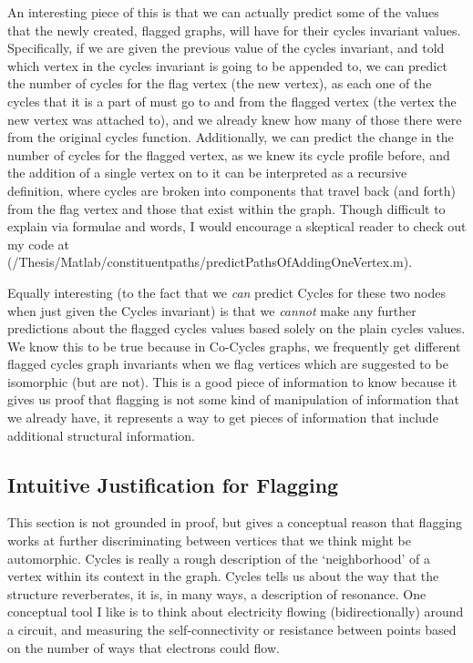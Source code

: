 An interesting piece of this is that we can actually predict some of the values that the newly created, flagged graphs, will have for their cycles invariant values.
Specifically, if we are given the previous value of the cycles invariant, and told which vertex in the cycles invariant is going to be appended to, we can predict the number of cycles for the flag vertex (the new vertex), as each one of the cycles that it is a part of must go to and from the flagged vertex (the vertex the new vertex was attached to), and we already knew how many of those there were from the original cycles function.
Additionally, we can predict the change in the number of cycles for the flagged vertex, as we knew its cycle profile before, and the addition of a single vertex on to it can be interpreted as a recursive definition, where cycles are broken into components that travel back (and forth) from the flag vertex and those that exist within the graph.
Though difficult to explain via formulae and words, I would encourage a skeptical reader to check out my code at (/Thesis/Matlab/constituentpaths/predictPathsOfAddingOneVertex.m).

Equally interesting (to the fact that we \emph{can} predict Cycles for these two nodes when just given the Cycles invariant) is that we \emph{cannot} make any further predictions about the flagged cycles values based solely on the plain cycles values.
We know this to be true because in Co-Cycles graphs, we frequently get different flagged cycles graph invariants when we flag vertices which are suggested to be isomorphic (but are not).
This is a good piece of information to know because it gives us proof that flagging is not some kind of manipulation of information that we already have, it represents a way to get pieces of information that include additional structural information.

\subsection{Intuitive Justification for Flagging}

This section is not grounded in proof, but gives a conceptual reason that flagging works at further discriminating between vertices that we think might be automorphic.
Cycles is really a rough description of the `neighborhood' of a vertex within its context in the graph.
Cycles tells us about the way that the structure reverberates, it is, in many ways, a description of resonance.
One conceptual tool I like is to think about electricity flowing (bidirectionally) around a circuit, and measuring the self-connectivity or resistance between points based on the number of ways that electrons could flow.

